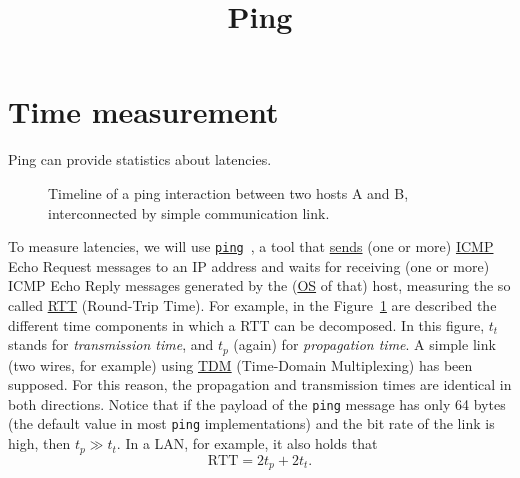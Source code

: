 
\title{Ping}

\maketitle
\tableofcontents

\section{Time measurement}
Ping can provide statistics about latencies.

\begin{figure}
  \begin{center}
  \end{center}
  \caption{Timeline of a ping interaction between two hosts A and B,
    interconnected by simple communication link.}
  \label{fig:ping_timeline}
\end{figure}

To measure latencies, we will use
\href{https://github.com/torvalds/linux/blob/master/net/ipv4/ping.c}{\texttt{ping}}~\cite{Kurose-Ross,Forouzan},
a tool that
\href{https://en.wikipedia.org/wiki/Ping_(networking_utility)}{sends}
(one or more)
\href{https://en.wikipedia.org/wiki/Internet_Control_Message_Protocol}{ICMP}
Echo Request messages to an IP address and waits for receiving (one or
more) ICMP Echo Reply messages generated by the
(\href{https://en.wikipedia.org/wiki/Operating_system}{OS} of that)
host, measuring the so called
\href{https://en.wikipedia.org/wiki/Round-trip_delay}{RTT} (Round-Trip
Time). For example, in the Figure~\ref{fig:ping_timeline} are
described the different time components in which a RTT can be
decomposed. In this figure, $t_t$ stands for \emph{transmission time},
and $t_p$ (again) for \emph{propagation time}. A simple link (two
wires, for example) using
\href{https://en.wikipedia.org/wiki/Time-division_multiple_access}{TDM}
(Time-Domain Multiplexing) has been supposed. For this reason, the
propagation and transmission times are identical in both
directions. Notice that if the payload of the \verb|ping| message has
only 64 bytes (the default value in most \verb|ping| implementations)
and the bit rate of the link is high, then $t_p\gg t_t.$ In a LAN, for
example, it also holds that
\begin{equation}
  \text{RTT} = 2t_p + 2t_t.
  \label{eq:RTT}
\end{equation}

